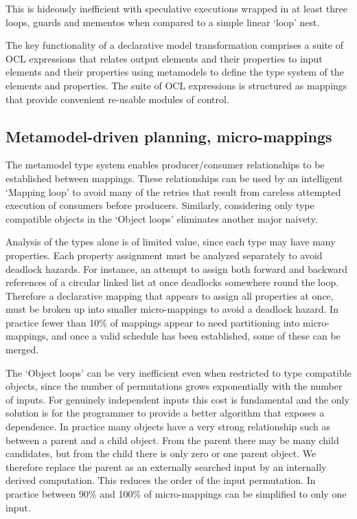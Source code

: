 \documentclass{llncs}
\begin{document}
This is hideously inefficient with speculative executions wrapped in at least three loops, guards and mementos when compared to a simple linear `loop' nest.

The key functionality of a declarative model transformation comprises a suite of OCL expressions that relates output elements and their properties to input elements and their properties using metamodels to define the type system of the elements and properties. The suite of OCL expressions is structured as mappings that provide convenient re-usable modules of control.

\subsection{Metamodel-driven planning, micro-mappings}

The metamodel type system enables producer/consumer relationships to be established between mappings. These relationships can be used by an intelligent `Mapping loop' to avoid many of the retries that result from careless attempted execution of consumers before producers. Similarly, considering only type compatible objects in the `Object loops' eliminates another major naivety. 

Analysis of the types alone is of limited value, since each type may have many properties. Each property assignment must be analyzed separately to avoid deadlock hazards. For instance, an attempt to assign both forward and backward references of a circular linked list at once deadlocks somewhere round the loop. Therefore a declarative mapping that appears to assign all properties at once, must be broken up into smaller micro-mappings to avoid a deadlock hazard. In practice fewer than 10\% of mappings appear to need partitioning into micro-mappings, and once a valid schedule has been established, some of these can be merged.

The `Object loops' can be very inefficient even when restricted to type compatible objects, since the number of permutations grows exponentially with the number of inputs. For genuinely independent inputs this cost is fundamental and the only solution is for the programmer to provide a better algorithm that exposes a dependence. In practice many objects have a very strong relationship such as between a parent and a child object. From the parent there may be many child candidates, but from the child there is only zero or one parent object. We therefore replace the parent as an externally searched input by an internally derived computation. This reduces the order of the input permutation. In practice between 90\% and 100\% of micro-mappings can be simplified to only one input.
\end{document}
